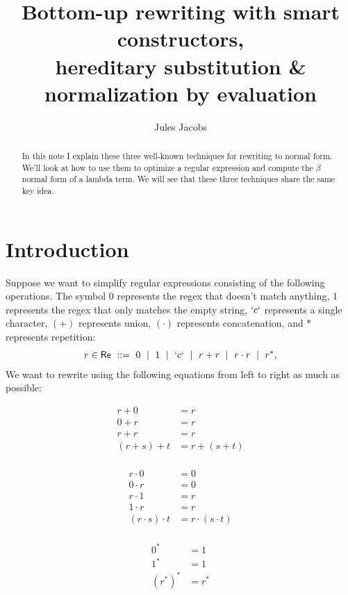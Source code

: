 \documentclass[a4paper, 11pt]{article}
\title{Bottom-up rewriting with smart constructors, \\ hereditary substitution \& normalization by evaluation}
\author{Jules Jacobs}
\theoremstyle{definition}
\begin{document}
\maketitle

\begin{abstract}
  In this note I explain these three well-known techniques for rewriting to normal form. We'll look at how to use them to optimize a regular expression and compute the $\beta$ normal form of a lambda term. We will see that these three techniques share the same key idea.
\end{abstract}


\tableofcontents


\section{Introduction}

\newcommand{\emp}{0}
\newcommand{\eps}{1}
\newcommand{\seq}{\cdot}
\newcommand{\md}{\ \mid \ }

Suppose we want to simplify regular expressions consisting of the following operations. The symbol $0$ represents the regex that doesn't match anything, $1$ represents the regex that only matches the empty string, $`c`$ represents a single character, $(+)$ represents union, $(\cdot)$ represents concatenation, and $*$ represents repetition:
\begin{align*}
  r \in \mathsf{Re} \ ::=\  \emp \md \eps \md `c` \md r + r \md r \seq r \md r^*,
\end{align*}
We want to rewrite using the following equations from left to right as much as possible: \vspace{-0.7cm}

\begin{minipage}[t]{0.3\textwidth}
  \begin{align*}
    r + \emp &= r \\
    \emp + r &= r \\
    r + r &= r \\
    (r + s) + t &= r + (s + t) \\
  \end{align*}
\end{minipage}
\begin{minipage}[t]{0.3\textwidth}
  \begin{align*}
    r \seq \emp &= \emp \\
    \emp \seq r &= \emp \\
    r \seq \eps &= r \\
    \eps \seq r &= r \\
    (r \seq s) \seq t &= r \seq (s \seq t) \\
  \end{align*}
\end{minipage}
\begin{minipage}[t]{0.3\textwidth}
  \begin{align*}
    \emp^* &= \eps \\
    \eps^* &= \eps \\
    (r^*)^* &= r^*
  \end{align*}
\end{minipage}
\end{document}
